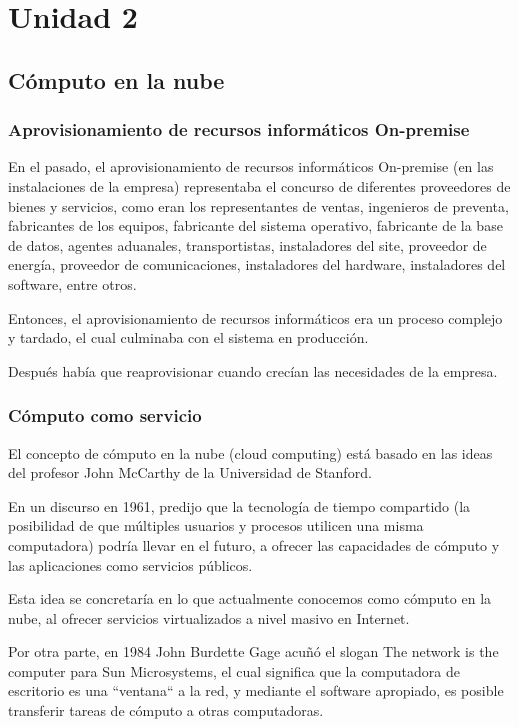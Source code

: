 \part{Unidad 2}

\chapter{Cómputo en la nube}

\section{Aprovisionamiento de recursos informáticos On-premise}

En el pasado, el aprovisionamiento de recursos informáticos On-premise (en las instalaciones de la empresa) representaba el concurso de diferentes proveedores de bienes y servicios, como eran los representantes de ventas, ingenieros de preventa, fabricantes de los equipos, fabricante del sistema operativo, fabricante de la base de datos, agentes aduanales, transportistas, instaladores del site, proveedor de energía, proveedor de comunicaciones, instaladores del hardware, instaladores del software, entre otros.

Entonces, el aprovisionamiento de recursos informáticos era un proceso complejo y tardado, el cual culminaba con el sistema en producción.

Después había que reaprovisionar cuando crecían las necesidades de la empresa.

\section{Cómputo como servicio}

El concepto de cómputo en la nube (cloud computing) está basado en las ideas del profesor John McCarthy de la Universidad de Stanford.

En un discurso en 1961, predijo que la tecnología de tiempo compartido (la posibilidad de que múltiples usuarios y procesos utilicen una misma computadora) podría llevar en el futuro, a ofrecer las capacidades de cómputo y las aplicaciones como servicios públicos.

Esta idea se concretaría en lo que actualmente conocemos como cómputo en la nube, al ofrecer servicios virtualizados a nivel masivo en Internet.

Por otra parte, en 1984 John Burdette Gage acuñó el slogan The network is the computer para Sun Microsystems, el cual significa que la computadora de escritorio es una ``ventana`` a la red, y mediante el software apropiado, es posible transferir tareas de cómputo a otras computadoras.

